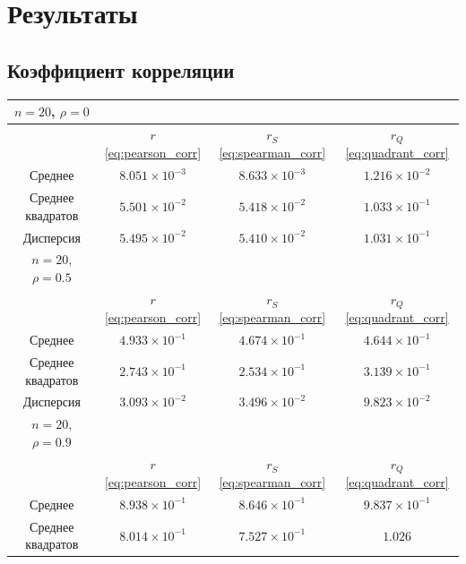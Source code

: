 \documentclass[12pt,a4paper]{article}
\begin{document}
	\section{Результаты}

	\subsection{Коэффициент корреляции}

	\begin{table}[htbp!]
		\centering
		\begin{tabular}{ |c|c|c|c| }
			\hline
			\( n = 20 \), \( \rho = 0 \) & & & \\
			\hline
			& \( r \) \eqref{eq:pearson_corr} & \( r_S \) \eqref{eq:spearman_corr} &
			\( r_Q \) \eqref{eq:quadrant_corr} \\
			\hline
			Среднее & \( 8.051 \times 10^{-3} \) & \( 8.633 \times 10^{-3} \) &
			\( 1.216 \times 10^{-2} \) \\
			\hline
			Среднее квадратов & \(5.501 \times 10^{-2} \) &
			\( 5.418 \times 10^{-2} \) & \( 1.033 \times 10^{-1} \) \\
			\hline
			Дисперсия & \( 5.495 \times 10^{-2} \) &
			\( 5.410 \times 10^{-2} \) & \( 1.031 \times 10^{-1} \) \\
			\hline
			\hline
			\( n = 20 \), \( \rho = 0.5 \) & & & \\
			\hline
			& \( r \) \eqref{eq:pearson_corr} & \( r_S \) \eqref{eq:spearman_corr} &
			\( r_Q \) \eqref{eq:quadrant_corr} \\
			\hline
			Среднее & \( 4.933 \times 10^{-1} \) & \( 4.674 \times 10^{-1} \) &
			\( 4.644 \times 10^{-1} \) \\
			\hline
			Среднее квадратов & \(2.743 \times 10^{-1} \) &
			\( 2.534 \times 10^{-1} \) & \( 3.139 \times 10^{-1} \) \\
			\hline
			Дисперсия & \( 3.093 \times 10^{-2} \) &
			\( 3.496 \times 10^{-2} \) & \( 9.823 \times 10^{-2} \) \\
			\hline
			\hline
			\( n = 20 \), \( \rho = 0.9 \) & & & \\
			\hline
			& \( r \) \eqref{eq:pearson_corr} & \( r_S \) \eqref{eq:spearman_corr} &
			\( r_Q \) \eqref{eq:quadrant_corr} \\
			\hline
			Среднее & \( 8.938 \times 10^{-1} \) & \( 8.646 \times 10^{-1} \) &
			\( 9.837 \times 10^{-1} \) \\
			\hline
			Среднее квадратов & \(8.014 \times 10^{-1} \) &
			\( 7.527 \times 10^{-1} \) & \( 1.026 \) \\

\end{tabular}
\end{table}
\end{document}
